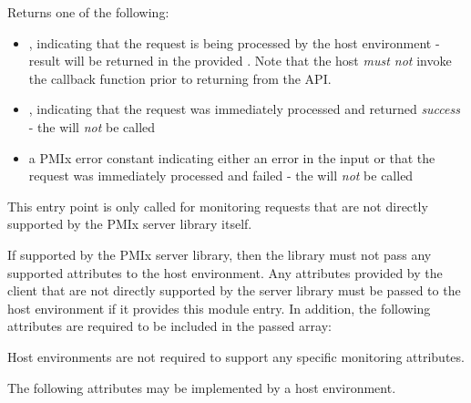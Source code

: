 Returns one of the following:

\begin{itemize}
    \item {}, indicating that the request is being processed by the host environment - result will be returned in the provided . Note that the host \emph{must not} invoke the callback function prior to returning from the \ac{API}.
    \item {}, indicating that the request was immediately processed and returned \textit{success} - the  will \textit{not} be called
    \item a PMIx error constant indicating either an error in the input or that the request was immediately processed and failed - the  will \textit{not} be called
\end{itemize}

This entry point is only called for monitoring requests that are not directly supported by the \ac{PMIx} server library itself.

\reqattrstart
If supported by the \ac{PMIx} server library, then the library must not pass any supported attributes to the host environment. Any attributes provided by the client that are not directly supported by the server library must be passed to the host environment if it provides this module entry. In addition, the following attributes are required to be included in the passed  array:


\divider

Host environments are not required to support any specific monitoring attributes.

\reqattrend

\optattrstart
The following attributes may be implemented by a host environment.


